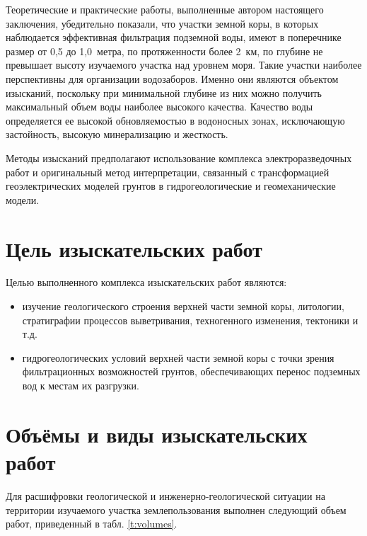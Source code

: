 Теоретические и практические работы, выполненные автором настоящего заключения, убедительно показали, что участки земной коры, в которых наблюдается эффективная фильтрация подземной воды, имеют в поперечнике размер от 0,5 до 1,0~метра, по протяженности более 2~км, по глубине не превышает высоту изучаемого участка над уровнем моря. Такие участки наиболее перспективны для организации водозаборов. Именно они являются объектом изысканий, поскольку при минимальной глубине из них можно получить максимальный объем воды наиболее высокого качества. Качество воды определяется ее высокой обновляемостью в водоносных зонах, исключающую застойность, высокую минерализацию и жесткость.

Методы изысканий предполагают использование комплекса электроразведочных работ и оригинальный метод интерпретации, связанный с трансформацией геоэлектрических моделей грунтов в гидрогеологические и геомеханические модели.

\section{Цель изыскательских работ}
Целью выполненного комплекса изыскательских работ являются:
\begin{itemize}
	\item изучение геологического строения верхней части земной коры, литологии, стратиграфии процессов выветривания, техногенного изменения, тектоники и т.д.
	\item гидрогеологических условий верхней части земной коры с точки зрения фильтрационных возможностей грунтов, обеспечивающих перенос подземных вод к местам их разгрузки.
\end{itemize}


\section{Объёмы и виды изыскательских работ}
Для расшифровки геологической и инженерно-геологической ситуации на территории изучаемого участка землепользования выполнен следующий объем работ, приведенный в табл. {\ref{t:volumes}}.

